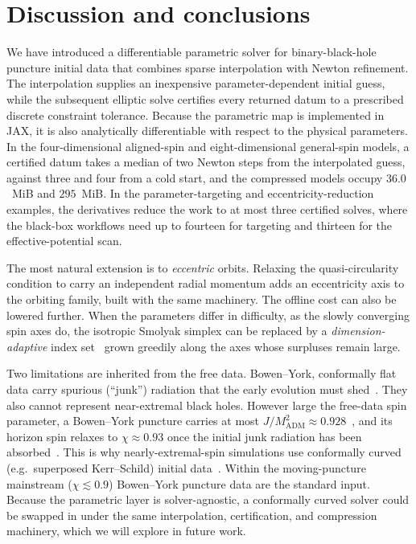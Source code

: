 \documentclass[
  aps,
  prd,
  twocolumn,
  10pt,
  amsmath,
  amssymb,
  nofootinbib,
  superscriptaddress,
  floatfix,
]{revtex4-2}
\newcommand{\Madm}{M_{\mathrm{ADM}}}
\begin{document}
\section{Discussion and conclusions}
\label{sec:conclusions}
We have introduced a differentiable parametric solver for binary-black-hole puncture initial data
that combines sparse interpolation with Newton refinement. The interpolation
supplies an inexpensive parameter-dependent initial guess, while the subsequent
elliptic solve certifies every returned datum to a prescribed discrete constraint tolerance.
Because the parametric map is implemented in JAX, it is also analytically
differentiable with respect to the physical parameters.
In the four-dimensional aligned-spin and eight-dimensional general-spin models, a certified datum takes a median of two Newton steps from the interpolated guess, against three and four from a cold start, and the compressed models occupy $36.0$~MiB and $295$~MiB.
In the parameter-targeting and eccentricity-reduction examples, the derivatives reduce the work to at most three certified solves, where the black-box workflows need up to fourteen for targeting and thirteen for the effective-potential scan.

The most natural extension is to
\emph{eccentric} orbits. Relaxing the quasi-circularity condition to carry an
independent radial momentum adds an eccentricity axis to the orbiting family, built with the same
machinery.
The offline cost can also be lowered further. When the parameters differ in difficulty, as the slowly converging spin axes do, the isotropic Smolyak simplex can be replaced by a \emph{dimension-adaptive} index set~\cite{GerstnerGriebel2003} grown greedily along the axes whose surpluses remain large.

Two limitations are inherited from the free data.
Bowen--York, conformally flat data carry spurious (``junk'')
radiation that the early evolution must shed~\cite{Lovelace2009}.
They also cannot represent near-extremal black holes.
However large the free-data spin parameter, a Bowen--York puncture carries at most $J/\Madm^2\approx0.928$~\cite{CookYork1990,Lovelace2008}, and its horizon spin relaxes to $\chi\approx0.93$ once the initial junk radiation has been absorbed~\cite{DainLoustoZlochower2008,Lovelace2008}.
This is why nearly-extremal-spin simulations use conformally curved (e.g.\ superposed
Kerr--Schild) initial data~\cite{Lovelace2008}.
Within the moving-puncture mainstream ($\chi\lesssim0.9$) Bowen--York puncture data are the standard input.
Because the parametric layer is solver-agnostic, a conformally curved solver could be swapped in
under the same interpolation, certification, and compression machinery, which we will explore in future work.
\end{document}
